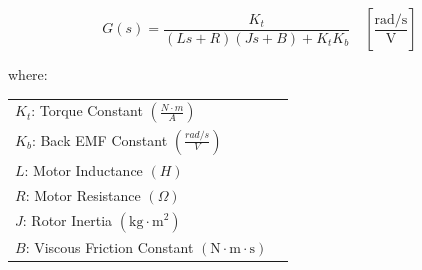 \documentclass[border={10pt, 10pt, 0pt, 10pt}]{standalone}
\begin{document}
    \begin{minipage}{10cm}
    \[
        G(s) = \frac{K_t}{(Ls + R)(Js + B) + K_t K_b} \quad \left[ \frac{\text{rad/s}}{\text{V}} \right]
    \]

    where: \\
        \begin{tabular}{l l}    
            $K_t$: Torque Constant $\left( \frac{N \cdot m}{A} \right)$ \\
            $K_b$: Back EMF Constant $\left( \frac{rad/s}{V} \right)$ \\
            $L$: Motor Inductance $(H)$ \\
            $R$: Motor Resistance $(\Omega)$ \\
            $J$: Rotor Inertia $(\text{kg}\cdot\text{m}^2)$ \\
            $B$: Viscous Friction Constant $(\text{N}\cdot\text{m}\cdot\text{s})$ \\
        \end{tabular}
    \end{minipage}
\end{document}
